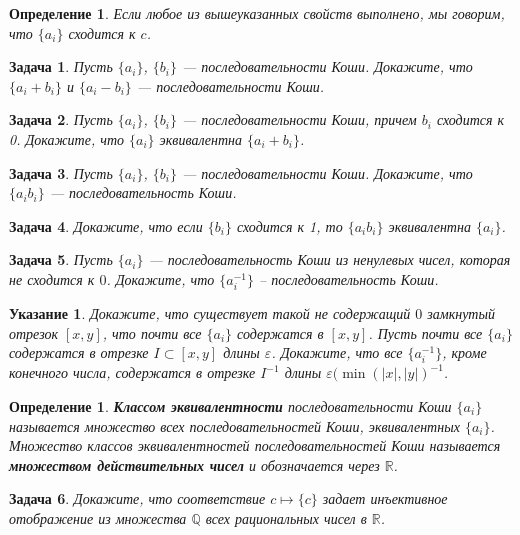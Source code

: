 \documentclass[12pt]{book}
\renewcommand{\epsilon}{\varepsilon}
\def\R{{\mathbb R}}
\def\Q{{\mathbb Q}}
\theoremstyle{upshape}
\newtheorem{zadacha}{Задача}[chapter]
\theoremstyle{generic}
\newtheorem{opredelenie}[teorema]{Определение}
\theoremstyle{upshapenonumber}
\newtheorem{ukazanie}{Указание}[section]
\newcommand{\следствие}{%
     \refstepcounter{teorema}
     {\noindent\bf Следствие \thechapter.\arabic{teorema}:\ }}
\newcommand{\пример}{%
     \refstepcounter{teorema}
     {\noindent\bf Пример \thechapter.\arabic{teorema}:\ }}
\newcommand{\лемма}{%
     \refstepcounter{teorema}
     {\noindent\bf Лемма \thechapter.\arabic{teorema}:\ }}
\newcommand{\теорема}{%
     \refstepcounter{teorema}
     {\noindent\bf Теорема \thechapter.\arabic{teorema}:\ }}
\newcommand{\утверждение}{%
     \refstepcounter{teorema}
     {\noindent\bf Утверждение \thechapter.\arabic{teorema}:\ }}
\begin{document}
\begin{opredelenie} Если любое из вышеуказанных свойств выполнено,
мы говорим, что $\{ a_i\}$ сходится к $c$.
\end{opredelenie}

\begin{zadacha}\label{sum} 
Пусть $\{ a_i\}$, $\{b_i\}$ --- последовательности Коши. Докажите,
что $\{ a_i + b_i \}$ и $\{ a_i-b_i \}$ --- последовательности
Коши.
\end{zadacha}

\begin{zadacha} Пусть $\{ a_i\}$, $\{b_i\}$ --- последовательности
Коши, причем $b_i$ сходится к 0. Докажите, что $\{ a_i\}$
эквивалентна $\{ a_i + b_i \}$.
\end{zadacha}

\begin{zadacha} Пусть $\{ a_i\}$, $\{b_i\}$ --- последовательности
Коши. Докажите, что $\{ a_i b_i \}$ --- последовательность Коши.
\end{zadacha}

\begin{zadacha} Докажите, что если $\{b_i\}$ сходится к 1, то $\{
a_i b_i \}$ эквивалентна $\{ a_i\}$.
\end{zadacha}

\begin{zadacha}\label{div} 
Пусть $\{ a_i\}$ --- последовательность Коши из ненулевых чисел,
которая не сходится к $0$. Докажите, что $\{ a_i^{-1}\}$ --
последовательность Коши.
\end{zadacha}

\begin{ukazanie} Докажите, что существует такой не содержащий $0$
замкнутый отрезок $[x, y]$, что почти все $\{ a_i\}$ содержатся в
$[x, y]$. Пусть почти все $\{ a_i\}$ содержатся в отрезке $I\subset
[x, y]$ длины $\epsilon$. Докажите, что все $\{ a_i^{-1}\}$, кроме
конечного числа, содержатся в отрезке $I^{-1}$ длины $\epsilon
(\min(|x|, |y|)^{-1}$.
\end{ukazanie}

\begin{opredelenie}
{\bf Классом эквивалентности} последовательности Коши $\{a_i\}$
называется множество всех последовательностей Коши, эквивалентных
$\{a_i\}$. Множество классов эквивалентностей последовательностей
Коши называется {\bf множеством действительных чисел} и обозначается
через $\R$.
\end{opredelenie}

\begin{zadacha}
Докажите, что соответствие $c \mapsto \{c\}$ задает инъективное
отображение из множества $\Q$ всех рациональных чисел в $\R$.
\end{zadacha}
\end{document}
